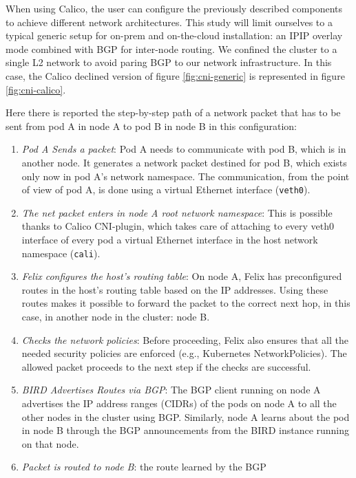 When using Calico, the user can configure the previously described components to
achieve different network architectures.
This study will limit ourselves to a typical generic setup for on-prem and
on-the-cloud installation: an IPIP overlay mode combined with BGP for inter-node
routing.
We confined the cluster to a single L2 network to avoid paring BGP to our
network infrastructure.
In this case, the Calico declined version of figure \ref{fig:cni-generic} is
represented in figure \ref{fig:cni-calico}.

Here there is reported the step-by-step path of a network packet that has to be
sent from pod A in node A to pod B in node B in this configuration:

\begin{enumerate}
  \itemsep0em
  \item \textit{Pod A Sends a packet}: Pod A needs to communicate with pod B,
    which is in another node. It generates a network packet destined for pod B,
    which exists only now in pod A's network namespace. The communication, from
    the point of view of pod A, is done using a virtual Ethernet interface
    (\texttt{veth0}).
  \item \textit{The net packet enters in node A root network namespace}: This is
    possible thanks to Calico CNI-plugin, which takes care of attaching to every
    veth0 interface of every pod a virtual Ethernet interface in the host
    network namespace (\texttt{cali}).
  \item \textit{Felix configures the host's routing table}: On node A, Felix has
    preconfigured routes in the host's routing table based on the IP addresses.
    Using these routes makes it possible to forward the packet to the correct
    next hop, in this case, in another node in the cluster: node B.
  \item \textit{Checks the network policies}: Before proceeding, Felix also
    ensures that all the needed security policies are enforced (e.g., Kubernetes
    NetworkPolicies). The allowed packet proceeds to the next step if the checks
    are successful.
  \item \textit{BIRD Advertises Routes via BGP}: The BGP client running on node
    A advertises the IP address ranges (CIDRs) of the pods on node A to all the
    other nodes in the cluster using BGP. Similarly, node A learns about the pod
    in node B through the BGP announcements from the BIRD instance running on
    that node.
  \item \textit{Packet is routed to node B}: the route learned by the BGP

\end{enumerate}
